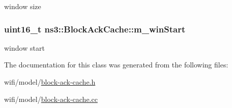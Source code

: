 window size 

\subsubsection[{\texorpdfstring{m\+\_\+win\+Start}{m_winStart}}]{\setlength{\rightskip}{0pt plus 5cm}uint16\+\_\+t ns3\+::\+Block\+Ack\+Cache\+::m\+\_\+win\+Start\hspace{0.3cm}{\ttfamily [private]}}\hypertarget{classns3_1_1BlockAckCache_a9504918377f4305f833737fcd62b45e6}{}\label{classns3_1_1BlockAckCache_a9504918377f4305f833737fcd62b45e6}


window start 



The documentation for this class was generated from the following files\+:\begin{DoxyCompactItemize}
\item 
wifi/model/\hyperlink{block-ack-cache_8h}{block-\/ack-\/cache.\+h}\item 
wifi/model/\hyperlink{block-ack-cache_8cc}{block-\/ack-\/cache.\+cc}\end{DoxyCompactItemize}

